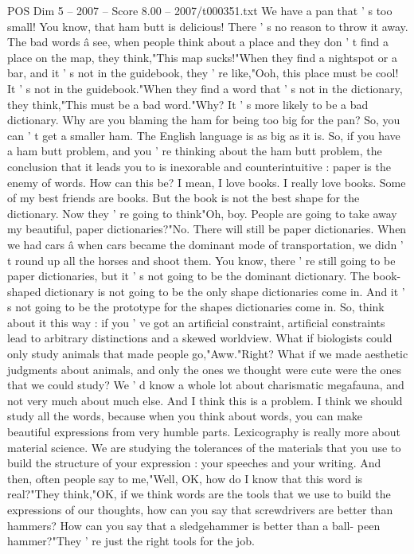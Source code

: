 \begin{textsample}{POS Dim 5 – 2007 – Score 8.00 – 2007/t000351.txt}
We have a pan that ' s too small!
You know, that ham butt is delicious!
There ' s no reason to throw it away.
The bad words â see, when people think about a place and they don ' t find a place on the map, they think,"This map sucks!"When they find a nightspot or a bar, and it ' s not in the guidebook, they ' re like,"Ooh, this place must be cool!
It ' s not in the guidebook."When they find a word that ' s not in the dictionary, they think,"This must be a bad word."Why?
It ' s more likely to be a bad dictionary.
Why are you blaming the ham for being too big for the pan?
So, you can ' t get a smaller ham.
The English language is as big as it is.
So, if you have a ham butt problem, and you ' re thinking about the ham butt problem, the conclusion that it leads you to is inexorable and counterintuitive : paper is the enemy of words.
How can this be?
I mean, I love books.
I really love books.
Some of my best friends are books.
But the book is not the best shape for the dictionary.
Now they ' re going to think"Oh, boy.
People are going to take away my beautiful, paper dictionaries?"No.
There will still be paper dictionaries.
When we had cars â when cars became the dominant mode of transportation, we didn ' t round up all the horses and shoot them.
You know, there ' re still going to be paper dictionaries, but it ' s not going to be the dominant dictionary.
The book-shaped dictionary is not going to be the only shape dictionaries come in.
And it ' s not going to be the prototype for the shapes dictionaries come in.
So, think about it this way : if you ' ve got an artificial constraint, artificial constraints lead to arbitrary distinctions and a skewed worldview.
What if biologists could only study animals that made people go,"Aww."Right?
What if we made aesthetic judgments about animals, and only the ones we thought were cute were the ones that we could study?
We ' d know a whole lot about charismatic megafauna, and not very much about much else.
And I think this is a problem.
I think we should study all the words, because when you think about words, you can make beautiful expressions from very humble parts.
Lexicography is really more about material science.
We are studying the tolerances of the materials that you use to build the structure of your expression : your speeches and your writing.
And then, often people say to me,"Well, OK, how do I know that this word is real?"They think,"OK, if we think words are the tools that we use to build the expressions of our thoughts, how can you say that screwdrivers are better than hammers?
How can you say that a sledgehammer is better than a ball- peen hammer?"They ' re just the right tools for the job.

\end{textsample}
